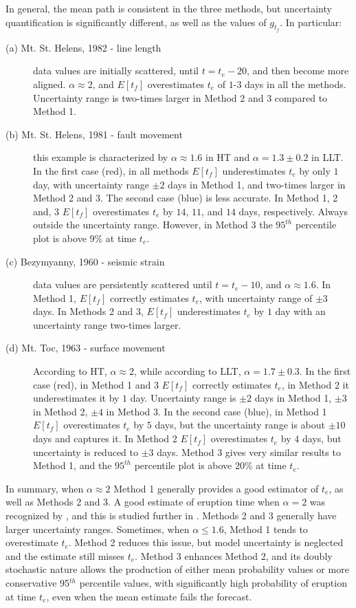 \documentclass{article}
\begin{document}
In general, the mean path is consistent in the three methods, but uncertainty quantification is significantly different, as well as the values of $g_{t_f}$. In particular:
\begin{description}
  \item[(a) Mt. St. Helens, 1982 - line length] data values are initially scattered, until $t = t_e - 20$, and then become more aligned. $\alpha \approx 2$, and $E[t_f]$ overestimates $t_e$ of $1$-$3$ days in all the methods. Uncertainty range is two-times larger in Method 2 and 3 compared to Method 1.
  \item[(b) Mt. St. Helens, 1981 - fault movement] this example is characterized by $\alpha \approx 1.6$ in HT and $\alpha = 1.3\pm 0.2$ in LLT. In the first case (red), in all methods $E[t_f]$ underestimates $t_e$ by only $1$ day, with uncertainty range $\pm 2$ days in Method 1, and two-times larger in Method 2 and 3. The second case (blue) is less accurate. In Method 1, 2 and, 3 $E[t_f]$ overestimates $t_e$ by $14$, $11$, and $14$ days, respectively. Always outside the uncertainty range. However, in Method 3 the $95^{th}$ percentile plot is above 9\% at time $t_e$.
  \item[(c) Bezymyanny, 1960 - seismic strain] data values are persistently scattered until $t = t_e - 10$, and $\alpha \approx 1.6$. In Method 1, $E[t_f]$ correctly estimates $t_e$, with uncertainty range of $\pm 3$ days. In Methods 2 and 3, $E[t_f]$ underestimates $t_e$ by $1$ day with an uncertainty range two-times larger.
  \item[(d) Mt. Toc, 1963 - surface movement] According to HT, $\alpha \approx 2$, while according to LLT, $\alpha= 1.7\pm0.3$. In the first case (red), in Method 1 and 3 $E[t_f]$ correctly estimates $t_e$, in Method 2 it underestimates it by $1$ day. Uncertainty range is $\pm 2$ days in Method 1, $\pm 3$ in Method 2, $\pm 4$ in Method 3. In the second case (blue), in Method 1 $E[t_f]$ overestimates $t_e$ by $5$ days, but the uncertainty range is about $\pm 10$ days and captures it. In Method 2 $E[t_f]$ overestimates $t_e$ by $4$ days, but uncertainty is reduced to $\pm 3$ days. Method 3 gives very similar results to Method 1, and the $95^{th}$ percentile plot is above 20\% at time $t_e$.
\end{description}

In summary, when $\alpha\approx 2$ Method 1 generally provides a good estimator of $t_e$, as well as Methods 2 and 3. A good estimate of eruption time when $\alpha=2$ was recognized by \cite{Voight1988}, and this is studied further in \cite{Kilburn2018}. Methods 2 and 3 generally have larger uncertainty ranges. Sometimes, when $\alpha \le 1.6$, Method 1 tends to overestimate $t_e$. Method 2 reduces this issue, but model uncertainty is neglected and the estimate still misses $t_e$. Method 3 enhances Method 2, and its doubly stochastic nature allows the production of either mean probability values or more conservative 95$^{th}$ percentile values, with significantly high probability of eruption at time $t_e$, even when the mean estimate fails the forecast.
\end{document}
